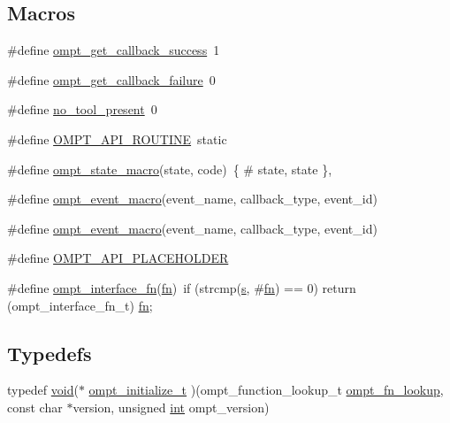 \subsection*{Macros}
\begin{DoxyCompactItemize}
\item 
\#define \hyperlink{ompt-general_8c_ad2830de7a342fa3a00e412d8a8769f6d}{ompt\-\_\-get\-\_\-callback\-\_\-success}~1
\item 
\#define \hyperlink{ompt-general_8c_aa7baf849202e0bccb77ebd8e42eb4f57}{ompt\-\_\-get\-\_\-callback\-\_\-failure}~0
\item 
\#define \hyperlink{ompt-general_8c_a71d61df3b4829ca8af8c5b4a17fea5e4}{no\-\_\-tool\-\_\-present}~0
\item 
\#define \hyperlink{ompt-general_8c_a83ee3110ea7d8f814842b08230c53a0d}{O\-M\-P\-T\-\_\-\-A\-P\-I\-\_\-\-R\-O\-U\-T\-I\-N\-E}~static
\item 
\#define \hyperlink{ompt-general_8c_a25148488abf9150d12fe066e6ad958d9}{ompt\-\_\-state\-\_\-macro}(state, code)~\{ \# state, state \},
\item 
\#define \hyperlink{ompt-general_8c_ad9ce08490c96c6c0a4fbf5903fcb7c2d}{ompt\-\_\-event\-\_\-macro}(event\-\_\-name, callback\-\_\-type, event\-\_\-id)
\item 
\#define \hyperlink{ompt-general_8c_ad9ce08490c96c6c0a4fbf5903fcb7c2d}{ompt\-\_\-event\-\_\-macro}(event\-\_\-name, callback\-\_\-type, event\-\_\-id)
\item 
\#define \hyperlink{ompt-general_8c_a84497e99deb376a72994dee99fdd5dc6}{O\-M\-P\-T\-\_\-\-A\-P\-I\-\_\-\-P\-L\-A\-C\-E\-H\-O\-L\-D\-E\-R}
\item 
\#define \hyperlink{ompt-general_8c_a22239a2e17d177311a26156b52deb248}{ompt\-\_\-interface\-\_\-fn}(\hyperlink{ittnotify__static_8h_a4da9f78418848eb6658704b4e8aa4aa7}{fn})~if (strcmp(\hyperlink{ittnotify__static_8h_a110bd9ede250f97ce56d81bb3c7b171d}{s}, \#\hyperlink{ittnotify__static_8h_a4da9f78418848eb6658704b4e8aa4aa7}{fn}) == 0) return (ompt\-\_\-interface\-\_\-fn\-\_\-t) \hyperlink{ittnotify__static_8h_a4da9f78418848eb6658704b4e8aa4aa7}{fn};
\end{DoxyCompactItemize}
\subsection*{Typedefs}
\begin{DoxyCompactItemize}
\item 
typedef \hyperlink{ittnotify__static_8h_af941d56e55e3c5465135b60c4d6343ed}{void}($\ast$ \hyperlink{ompt-general_8c_a47a896f6788d17f33e959156e0e4ffc0}{ompt\-\_\-initialize\-\_\-t} )(ompt\-\_\-function\-\_\-lookup\-\_\-t \hyperlink{ompt-general_8c_a7d3f217c9de3e9699cd44e98e590e9bc}{ompt\-\_\-fn\-\_\-lookup}, const char $\ast$version, unsigned \hyperlink{ittnotify__static_8h_a8b8dcd723308a8cb5d84277c7a3fff70}{int} ompt\-\_\-version)
\end{DoxyCompactItemize}
